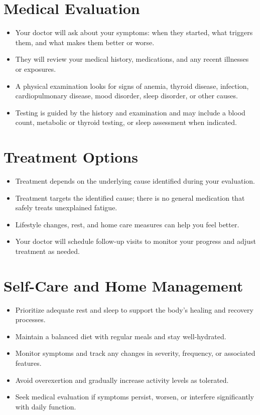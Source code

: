 \section*{Medical Evaluation}
\begin{itemize}
  \item Your doctor will ask about your symptoms: when they started, what triggers them, and what makes them better or worse.
  \item They will review your medical history, medications, and any recent illnesses or exposures.
  \item A physical examination looks for signs of anemia, thyroid disease, infection, cardiopulmonary disease, mood disorder, sleep disorder, or other causes.
  \item Testing is guided by the history and examination and may include a blood count, metabolic or thyroid testing, or sleep assessment when indicated.
\end{itemize}

\section*{Treatment Options}
\begin{itemize}
  \item Treatment depends on the underlying cause identified during your evaluation.
  \item Treatment targets the identified cause; there is no general medication that safely treats unexplained fatigue.
  \item Lifestyle changes, rest, and home care measures can help you feel better.
  \item Your doctor will schedule follow-up visits to monitor your progress and adjust treatment as needed.
\end{itemize}


\section*{Self-Care and Home Management}
\begin{itemize}
  \item Prioritize adequate rest and sleep to support the body's healing and recovery processes.
  \item Maintain a balanced diet with regular meals and stay well-hydrated.
  \item Monitor symptoms and track any changes in severity, frequency, or associated features.
  \item Avoid overexertion and gradually increase activity levels as tolerated.
  \item Seek medical evaluation if symptoms persist, worsen, or interfere significantly with daily function.
\end{itemize}


